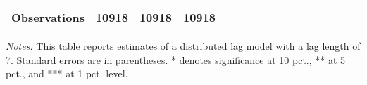 \begin{table}[htbp]
{\begin{threeparttable}
\begin{tabular}{l*{3}{c}}
Observations    &    10918         &    10918         &    10918         \\
\bottomrule \end{tabular} \begin{tablenotes}[flushleft] \footnotesize \item \emph{Notes:} This table reports estimates of a distributed lag model with a lag length of 7. Standard errors are in parentheses. * denotes significance at 10 pct., ** at 5 pct., and *** at 1 pct. level. \end{tablenotes} \end{threeparttable} } \end{table}

